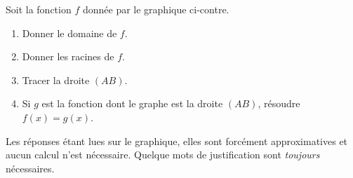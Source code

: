 
\begin{exercice}\label{exosmath-0006}

    \begin{multicols}{2}
    Soit la fonction \( f\) donnée par le graphique ci-contre.
        \begin{enumerate}
            \item
                Donner le domaine de \( f\).
            \item
                Donner les racines de \( f\).
            \item 
                Tracer la droite \( (AB)\).
            \item
                Si \( g\) est la fonction dont le graphe est la droite \( (AB)\), résoudre \( f(x)=g(x)\).
        \end{enumerate}


        \columnbreak



    \end{multicols}
    Les réponses étant lues sur le graphique, elles sont forcément approximatives et aucun calcul n'est nécessaire. Quelque mots de justification sont \emph{toujours} nécessaires.

\end{exercice}
